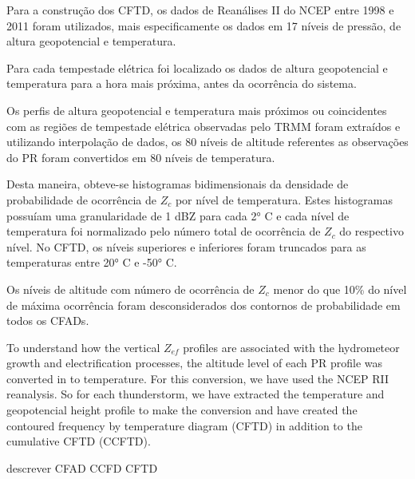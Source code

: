 
Para a construção dos CFTD, os dados de Reanálises II do NCEP \cite{kanamitsu} entre 1998 e 2011 foram utilizados, mais especificamente os dados em 17 níveis de pressão, de altura geopotencial e temperatura. 

Para cada tempestade elétrica foi localizado os dados de altura geopotencial e temperatura para a hora mais próxima, antes da ocorrência do sistema.

Os perfis de altura geopotencial e temperatura mais próximos ou coincidentes com as regiões de tempestade elétrica observadas pelo TRMM foram extraídos e utilizando interpolação de dados, os 80 níveis de altitude referentes as observações do PR foram convertidos em 80 níveis de temperatura.

Desta maneira, obteve-se histogramas bidimensionais da densidade de probabilidade de ocorrência de $Z_{c}$ por nível de temperatura. Estes histogramas possuíam uma granularidade de 1 dBZ para cada 2° C e cada nível de temperatura foi normalizado pelo número total de ocorrência de $Z_c$ do respectivo nível. No CFTD, os níveis superiores e inferiores foram truncados para as temperaturas entre 20° C e -50° C.



Os níveis de altitude com número de ocorrência de $Z_c$ menor do que 10\% do nível de máxima ocorrência foram desconsiderados dos contornos de probabilidade em todos os CFADs.

 














To understand how the vertical $Z_{ef}$ profiles are associated with the hydrometeor growth and electrification processes, the altitude level of each PR profile was converted in to temperature. For this conversion, we have used the NCEP RII reanalysis. So for each thunderstorm, we have extracted the temperature and geopotencial height profile to make the conversion and have created the contoured frequency by temperature diagram (CFTD) in addition to the cumulative CFTD (CCFTD).


descrever CFAD CCFD CFTD

